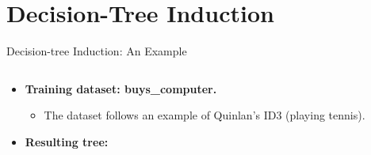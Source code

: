 \section{Decision-Tree Induction}

\begin{frame}{Decision-tree Induction: An Example}
	\begin{columns}
		\begin{column}{0.38\textwidth}
			\vspace{-3cm}
			\begin{itemize}
				\item \textbf{Training dataset: buys\_computer.}
				      \begin{itemize}
					      \item The dataset follows an example of Quinlan's ID3 (playing tennis).
				      \end{itemize}
				\item \textbf{Resulting tree:}\\[0.1cm]
			\end{itemize}
			\centering
			
		\end{column}
		\begin{column}{0.62\textwidth}
			\small
			
		\end{column}
	\end{columns}
\end{frame}


